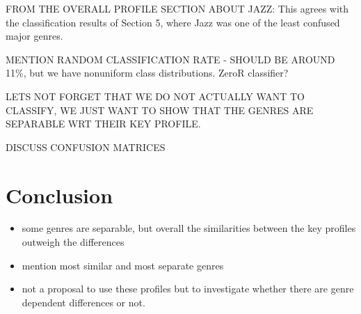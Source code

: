 \documentclass{article}
\begin{document}
    FROM THE OVERALL PROFILE SECTION ABOUT JAZZ: This agrees with the classification results of Section 5, where Jazz was one of the least confused major genres.
    
    MENTION RANDOM CLASSIFICATION RATE - SHOULD BE AROUND 11\%, but we have nonuniform class distributions. ZeroR classifier?
    
    LETS NOT FORGET THAT WE DO NOT ACTUALLY WANT TO CLASSIFY, WE JUST WANT TO SHOW THAT THE GENRES ARE SEPARABLE WRT THEIR KEY PROFILE.
    
    DISCUSS CONFUSION MATRICES

\section{Conclusion}
\begin{itemize}
    \item   some genres are separable, but overall the similarities between the key profiles outweigh the differences
    \item   mention most similar and most separate genres
    \item   not a proposal to use these profiles but to investigate whether there are genre dependent differences or not.
\end{itemize}



\end{document}
